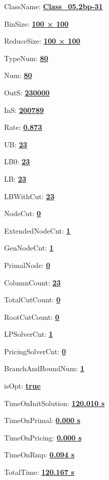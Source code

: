 \documentclass[11pt]{article}
\begin{document}
\pagestyle{empty}


ClassName: \underline{\textbf{Class_05.2bp-31}}
\par
BinSize: \underline{\textbf{100 × 100}}
\par
ReduceSize: \underline{\textbf{100 × 100}}
\par
TypeNum: \underline{\textbf{80}}
\par
Num: \underline{\textbf{80}}
\par
OutS: \underline{\textbf{230000}}
\par
InS: \underline{\textbf{200789}}
\par
Rate: \underline{\textbf{0.873}}
\par
UB: \underline{\textbf{23}}
\par
LB0: \underline{\textbf{23}}
\par
LB: \underline{\textbf{23}}
\par
LBWithCut: \underline{\textbf{23}}
\par
NodeCut: \underline{\textbf{0}}
\par
ExtendedNodeCnt: \underline{\textbf{1}}
\par
GenNodeCnt: \underline{\textbf{1}}
\par
PrimalNode: \underline{\textbf{0}}
\par
ColumnCount: \underline{\textbf{23}}
\par
TotalCutCount: \underline{\textbf{0}}
\par
RootCutCount: \underline{\textbf{0}}
\par
LPSolverCnt: \underline{\textbf{1}}
\par
PricingSolverCnt: \underline{\textbf{0}}
\par
BranchAndBoundNum: \underline{\textbf{1}}
\par
isOpt: \underline{\textbf{true}}
\par
TimeOnInitSolution: \underline{\textbf{120.010 s}}
\par
TimeOnPrimal: \underline{\textbf{0.000 s}}
\par
TimeOnPricing: \underline{\textbf{0.000 s}}
\par
TimeOnRmp: \underline{\textbf{0.094 s}}
\par
TotalTime: \underline{\textbf{120.167 s}}
\par
\newpage


\end{document}
